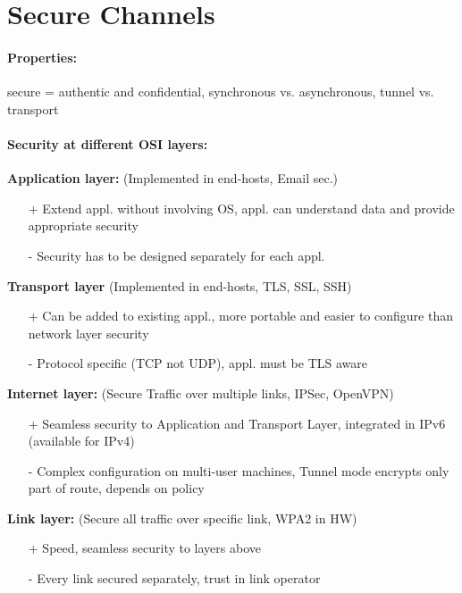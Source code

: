 \section{Secure Channels}

\paragraph{Properties:} secure = authentic and confidential, synchronous vs. asynchronous, tunnel vs. transport

\paragraph{Security at different OSI layers:}

\textbf{Application layer:} (Implemented in end-hosts, Email sec.)
\begin{itemize}
\item[+] Extend appl. without involving OS, appl. can understand data and provide appropriate security
\item[-] Security has to be designed separately for each appl.
\end{itemize}

\textbf{Transport layer} (Implemented in end-hosts, TLS, SSL, SSH)
\begin{itemize}
\item[+] Can be added to existing appl., more portable and easier to configure than network layer security
\item[-] Protocol specific (TCP not UDP), appl. must be TLS aware
\end{itemize}

\textbf{Internet layer:} (Secure Traffic over multiple links, IPSec, OpenVPN)
\begin{itemize}
\item[+] Seamless security to Application and Transport Layer, integrated in IPv6 (available for IPv4)
\item[-] Complex configuration on multi-user machines, Tunnel mode encrypts only part of route, depends on policy
\end{itemize}

\textbf{Link layer:} (Secure all traffic over specific link, WPA2 in HW)
\begin{itemize}
\item[+] Speed, seamless security to layers above
\item[-] Every link secured separately, trust in link operator
\end{itemize}

